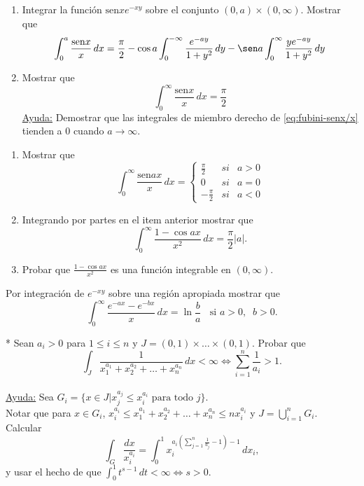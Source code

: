 \documentclass{book}
\begin{document}
\begin{ejer}{} 
\begin{enumerate}
\item Integrar la función $\text{sen} x e^{-xy}$ sobre el conjunto $(0,a)\times (0,\infty)$.
Mostrar que 
\begin{equation}\label{eq:fubini-senx/x}
\int_0^a \frac{\text{sen} x}{x}\,dx=
\frac{\pi}{2}-\cos a\int_0^{-\infty} \frac{e^{-ay}}{1+y^2}\,dy
-\sen a \int_0^{\infty} \frac{y e^{-ay}}{1+y^2}\,dy
\end{equation}
\item Mostrar que 
\[
\int_0^{\infty }\frac{\text{sen} x}{x}\,dx=\frac{\pi}{2}
\]
\underline{Ayuda:} 
Demostrar que las integrales de miembro derecho de \eqref{eq:fubini-senx/x} tienden a 0 cuando $a \to \infty$.
\end{enumerate} 
\end{ejer}


\begin{ejer}{}
\begin{enumerate}
\item Mostrar que
\[
\int_0^{\infty} \frac{\text{sen} a x}{x}\,dx= 
\left
\{\begin{array}{rll}
\frac{\pi}{2}&si&a>0
\\
0&si&a=0
\\
-\frac{\pi}{2}&si&a<0
\end{array}
\right.
\] 
\item Integrando por partes en el item anterior mostrar que
\[
\int_0^{\infty}\frac{1-\cos ax}{x^2}\,dx=\frac{\pi}{2}|a|.
\]
\item Probar que $\frac{1-\cos ax}{x^2}$ es una función integrable en $(0,\infty)$.
\end{enumerate}
\end{ejer}


\begin{ejer}{}
 Por integración de $e^{-xy}$ sobre una región apropiada mostrar que 
\[
\int_0^{\infty}\frac{e^{-ax}-e^{-bx}}{x}\,dx=\ln\frac{b}{a}\;\; \mbox{  si   }a>0, \;\;b>0.
\]
\end{ejer}



\begin{ejer}{}*
 Sean $a_i>0$ para $1\leq i \leq n$ y $J=(0,1)\times \ldots \times (0,1)$.
Probar que 
\[
\int_J  \frac{1}{x_1^{a_1}+x_2^{a_2}+\ldots+x_n^{a_n}}\,dx<\infty 
\Longleftrightarrow
\sum\limits_{i=1}^{n}\frac{1}{a_i}>1.
\]
\\
\underline{Ayuda:}
Sea $G_i=\{x \in J | x_j^{a_j} \leq x_i^{a_i} \mbox{ para todo  } j \}$. \\
Notar que para $x \in G_i$, $x_i^{a_i}\leq x_1^{a_1}+x_2^{a_2}+\ldots+x_n^{a_n}\leq n x_i^{a_i}$
y $J=\bigcup\limits_{i=1}^{n} G_i$. \\
Calcular 
\[
\int_G \frac{dx}{x_i^{a_i}}=\int_0^1 x_i ^{a_i\left(\sum\limits_{j=1}^n \frac{1}{a_j}-1\right)-1}\,dx_i,
\]
y usar el hecho de que $\int_0^1 t^{s-1}\,dt<\infty \Leftrightarrow s>0$.
\end{ejer}
\end{document}
